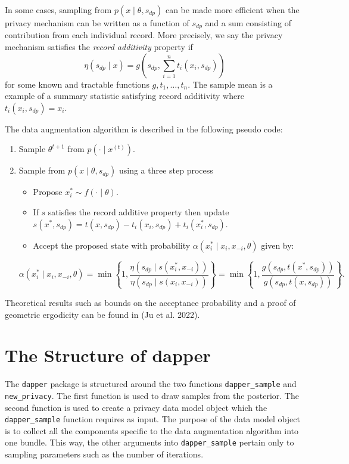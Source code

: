 In some cases, sampling from \(p(x \mid \theta, s_{dp})\) can be made more efficient
when the privacy mechanism can be written as a function of \(s_{dp}\) and
a sum consisting of contribution from each individual record. More precisely, we say the privacy mechanism satisfies
the \emph{record additivity} property if
\[
\eta(s_{dp} \mid x) = g\left(s_{dp}, \sum_{i=1}^{n}t_i(x_i, s_{dp}) \right)
\]
for some known and tractable functions \(g, t_1, \ldots, t_n\). The sample mean is a
example of a summary statistic satisfying record additivity where \(t_i(x_i, s_{dp}) = x_i\).

The data augmentation algorithm is described in the following pseudo code:

\begin{enumerate}
\def\labelenumi{\arabic{enumi}.}
\tightlist
\item
  Sample \(\theta^{t+1}\) from \(p(\cdot \mid x^{(t)})\).
\item
  Sample from \(p(x \mid \theta, s_{dp})\) using a three step process

  \begin{itemize}
  \tightlist
  \item
    Propose \(x_{i}^{*} \sim f(\cdot \mid \theta)\).
  \item
    If \(s\) satisfies the record additive property then
    update \(s(x^*, s_{dp}) = t(x,s_{dp}) - t_i(x_i,s_{dp}) + t_{i}(x_i^*, s_{dp})\).
  \item
    Accept the proposed state with probability \(\alpha(x_i^* \mid x_i, x_{-i}, \theta)\)
    given by:
  \end{itemize}

  \[
     \alpha(x_i^* \mid x_i, x_{-i}, \theta) = \min \left\{ 1, \dfrac{\eta(s_{dp} \mid s(x_i^*, x_{-i}))}{\eta(s_{dp} \mid s(x_i, x_{-i}))} \right\}  
     = \min \left\{ 1, \dfrac{g(s_{dp}, t(x^*, s_{dp}))}{g(s_{dp}, t(x,s_{dp}))} \right\}.
   \]
\end{enumerate}

Theoretical results such as bounds on the acceptance probability and a proof
of geometric ergodicity can be found in (Ju et al. 2022).

\hypertarget{the-structure-of-dapper}{%
\section{The Structure of dapper}\label{the-structure-of-dapper}}

The \texttt{dapper} package is structured around the two functions \texttt{dapper\_sample} and
\texttt{new\_privacy}. The first function is used to draw samples from the
posterior. The second function is used to create a privacy data model object
which the \texttt{dapper\_sample} function requires as input. The purpose of the data model
object is to collect all the components specific to the data augmentation algorithm
into one bundle. This way, the other arguments into \texttt{dapper\_sample} pertain only
to sampling parameters such as the number of iterations.

